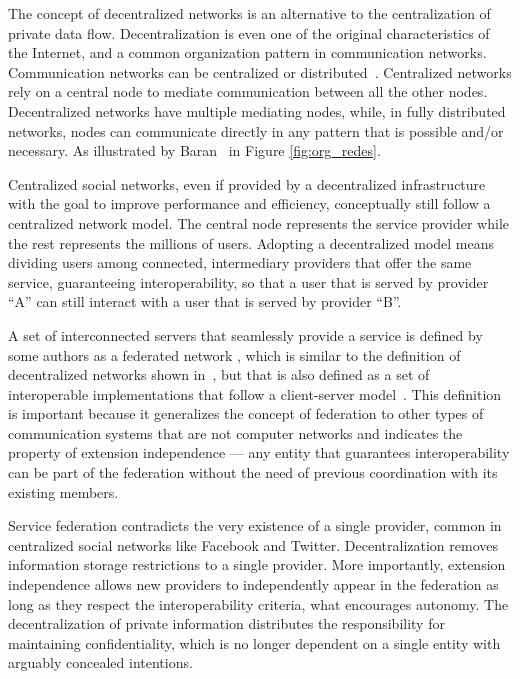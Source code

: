 The concept of decentralized networks is an alternative to the centralization
of private data flow. Decentralization is even one of the original
characteristics of the Internet, and a common organization pattern in
communication networks. Communication networks can be centralized or
distributed~\cite{baran1964}. Centralized networks rely on a central node to
mediate communication between all the other nodes.  Decentralized networks have
multiple mediating nodes, while, in fully distributed networks, nodes can
communicate directly in any pattern that is possible and/or necessary. As
illustrated by Baran~\cite{baran1964} in Figure \ref{fig:org_redes}.

Centralized social networks, even if provided by a decentralized
infrastructure with the goal to improve performance and efficiency,
conceptually still follow a centralized network model. The central node
represents the service provider while the rest represents the millions
of users. Adopting a decentralized model means dividing users among
connected, intermediary providers that offer the same service,
guaranteeing interoperability, so that a user that is served by provider
``A'' can still interact with a user that is served by provider ``B''.

A set of interconnected servers that seamlessly provide a service is defined by
some authors as a federated network \cite{fednetworks}, which is similar to the
definition of decentralized networks shown in~\cite{baran1964}, but that is also
defined as a set of interoperable implementations that follow a client-server
model~\cite{barocas2012}.  This definition is important because it generalizes
the concept of federation to other types of communication systems that are
not computer networks and indicates the property of extension independence --- any
entity that guarantees interoperability can be part of the federation without
the need of previous coordination with its existing members.

Service federation contradicts the very existence of a single provider,
common in centralized social networks like Facebook and Twitter.
Decentralization removes information storage restrictions to a single
provider. More importantly, extension independence allows new providers
to independently appear in the federation as long as they respect the
interoperability criteria, what encourages autonomy. The decentralization
of private information distributes the responsibility for maintaining
confidentiality, which is no longer dependent on a single entity with
arguably concealed intentions.

